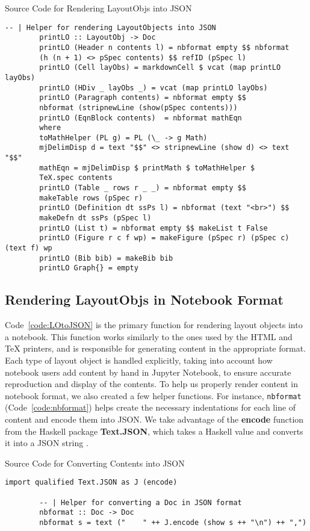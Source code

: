 \begin{listing}[h]
	\caption{Source Code for Rendering LayoutObjs into JSON}
	\label{code:LOtoJSON}
	\begin{lstlisting}[language=haskell1]
		-- | Helper for rendering LayoutObjects into JSON
		printLO :: LayoutObj -> Doc
		printLO (Header n contents l) = nbformat empty $$ nbformat 
		(h (n + 1) <> pSpec contents) $$ refID (pSpec l)
		printLO (Cell layObs) = markdownCell $ vcat (map printLO layObs)
		printLO (HDiv _ layObs _) = vcat (map printLO layObs) 
		printLO (Paragraph contents) = nbformat empty $$
		nbformat (stripnewLine (show(pSpec contents)))
		printLO (EqnBlock contents)  = nbformat mathEqn
		where
		toMathHelper (PL g) = PL (\_ -> g Math)
		mjDelimDisp d = text "$$" <> stripnewLine (show d) <> text "$$" 
		mathEqn = mjDelimDisp $ printMath $ toMathHelper $ 
		TeX.spec contents
		printLO (Table _ rows r _ _) = nbformat empty $$
		makeTable rows (pSpec r)
		printLO (Definition dt ssPs l) = nbformat (text "<br>") $$ 
		makeDefn dt ssPs (pSpec l)
		printLO (List t) = nbformat empty $$ makeList t False
		printLO (Figure r c f wp) = makeFigure (pSpec r) (pSpec c) (text f) wp
		printLO (Bib bib) = makeBib bib
		printLO Graph{} = empty 
	\end{lstlisting}
\end{listing}

\subsection{Rendering LayoutObjs in Notebook Format}
Code~\ref{code:LOtoJSON} is the primary function for rendering layout objects 
into a notebook. This function works similarly to the ones used by the HTML and 
TeX printers, and is responsible for generating content in the appropriate 
format. Each type of layout object is handled explicitly, taking into account 
how notebook users add content by hand in Jupyter Notebook, to ensure accurate 
reproduction and display of the contents. To help us properly render content in 
notebook format, we also created a few helper functions. For instance, 
\texttt{nbformat} (Code~\ref{code:nbformat}) helps create the 
necessary 
indentations for each line of content and encode them into JSON. We take 
advantage of the \textbf{encode} function from the Haskell package 
\textbf{Text.JSON}, which takes a Haskell value and converts it into a JSON 
string \cite{textdotjosn}. 

\begin{listing}[h]
	\caption{Source Code for Converting Contents into JSON}
	\label{code:nbformat}
	\begin{lstlisting}[language=haskell1]
		import qualified Text.JSON as J (encode) 
		
		-- | Helper for converting a Doc in JSON format
		nbformat :: Doc -> Doc
		nbformat s = text ("    " ++ J.encode (show s ++ "\n") ++ ",")
	\end{lstlisting}
\end{listing}

